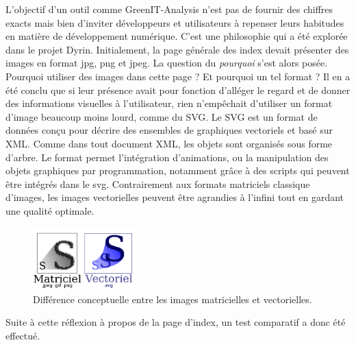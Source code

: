 \documentclass[a4paper,12pt,twoside]{book}
\begin{document}
L'objectif d'un outil comme GreenIT-Analysis n'est pas de fournir des chiffres exacts mais bien d'inviter développeurs et utilisateurs à repenser leurs habitudes en matière de développement numérique. C'est une philosophie qui a été explorée dans le projet Dyrin. Initialement, la page générale des index devait présenter des images en format jpg, png et jpeg. La question du \textit{pourquoi} s'est alors posée. Pourquoi utiliser des images dans cette page ? Et pourquoi un tel format ? Il en a été conclu que si leur présence avait pour fonction d'alléger le regard et de donner des informations visuelles à l'utilisateur, rien n'empêchait d'utiliser un format d'image beaucoup moins lourd, comme du \acrshort{SVG}. Le \acrfull{SVG} est un format de données conçu pour décrire des ensembles de graphiques vectoriels et basé sur XML. Comme dans tout document XML, les objets sont organisés sous forme d'arbre. Le format permet l'intégration d'animations, ou la manipulation des objets graphiques par programmation, notamment grâce à des scripts qui peuvent être intégrés dans le svg. Contrairement aux formats matriciels classique d'images, les images vectorielles peuvent être agrandies à l'infini tout en gardant une qualité optimale. 

\begin{figure}[H]
    \centering
    \includegraphics[width=4cm]{img/partie_3/svg.png}
    \caption{Différence conceptuelle entre les images matricielles et vectorielles.}
\end{figure}

Suite à cette réflexion à propos de la page d'index, un test comparatif a donc été effectué.
\end{document}
